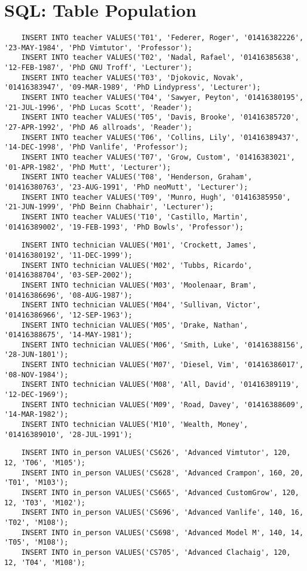 \documentclass[11pt, english]{article}
\begin{document}
\section{SQL: Table Population}

	{\scriptsize\begin{verbatim}
	INSERT INTO teacher VALUES('T01', 'Federer, Roger', '01416382226', '23-MAY-1984', 'PhD Vimtutor', 'Professor');
	INSERT INTO teacher VALUES('T02', 'Nadal, Rafael', '01416385638', '12-FEB-1987', 'PhD GNU Troff', 'Lecturer');
	INSERT INTO teacher VALUES('T03', 'Djokovic, Novak', '01416383947', '09-MAR-1989', 'PhD Lindypress', 'Lecturer');
	INSERT INTO teacher VALUES('T04', 'Sawyer, Peyton', '01416380195', '21-JUL-1996', 'PhD Lucas Scott', 'Reader');
	INSERT INTO teacher VALUES('T05', 'Davis, Brooke', '01416385720', '27-APR-1992', 'PhD A6 allroads', 'Reader');
	INSERT INTO teacher VALUES('T06', 'Collins, Lily', '01416389437', '14-DEC-1998', 'PhD Vanlife', 'Professor');
	INSERT INTO teacher VALUES('T07', 'Grow, Custom', '01416383021', '01-APR-1982', 'PhD Mutt', 'Lecturer');
	INSERT INTO teacher VALUES('T08', 'Henderson, Graham', '01416380763', '23-AUG-1991', 'PhD neoMutt', 'Lecturer');
	INSERT INTO teacher VALUES('T09', 'Munro, Hugh', '01416385950', '21-JUN-1999', 'PhD Beinn Chabhair', 'Lecturer');
	INSERT INTO teacher VALUES('T10', 'Castillo, Martin', '01416389002', '19-FEB-1993', 'PhD Bowls', 'Professor');
	\end{verbatim}}

	{\scriptsize\begin{verbatim}
	INSERT INTO technician VALUES('M01', 'Crockett, James', '01416380192', '11-DEC-1999');
	INSERT INTO technician VALUES('M02', 'Tubbs, Ricardo', '01416388704', '03-SEP-2002');
	INSERT INTO technician VALUES('M03', 'Moolenaar, Bram', '01416386696', '08-AUG-1987');
	INSERT INTO technician VALUES('M04', 'Sullivan, Victor', '01416386966', '12-SEP-1963');
	INSERT INTO technician VALUES('M05', 'Drake, Nathan', '01416388675', '14-MAY-1981');
	INSERT INTO technician VALUES('M06', 'Smith, Luke', '01416388156', '28-JUN-1801');
	INSERT INTO technician VALUES('M07', 'Diesel, Vim', '01416386017', '08-NOV-1984');
	INSERT INTO technician VALUES('M08', 'All, David', '01416389119', '12-DEC-1969');
	INSERT INTO technician VALUES('M09', 'Road, Davey', '01416388609', '14-MAR-1982');
	INSERT INTO technician VALUES('M10', 'Wealth, Money', '01416389010', '28-JUL-1991');
	\end{verbatim}}

	{\scriptsize\begin{verbatim}
	INSERT INTO in_person VALUES('CS626', 'Advanced Vimtutor', 120, 12, 'T06', 'M105');
	INSERT INTO in_person VALUES('CS628', 'Advanced Crampon', 160, 20, 'T01', 'M103');
	INSERT INTO in_person VALUES('CS665', 'Advanced CustomGrow', 120, 12, 'T03', 'M102');
	INSERT INTO in_person VALUES('CS696', 'Advanced Vanlife', 140, 16, 'T02', 'M108');
	INSERT INTO in_person VALUES('CS698', 'Advanced Model M', 140, 14, 'T05', 'M108');
	INSERT INTO in_person VALUES('CS705', 'Advanced Clachaig', 120, 12, 'T04', 'M108');
	\end{verbatim}}
\end{document}
